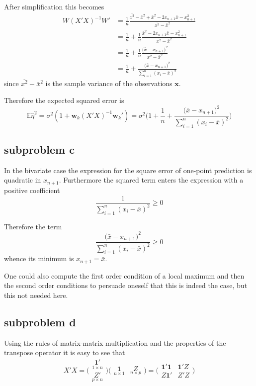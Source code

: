 \documentclass[a4paper]{article}
\newcommand{\w}{\mathbf{w}}
\newcommand{\e}{\mathbf{1}}
\newcommand{\Ex}{\mathbb{E}}
\begin{document}
After simplification this becomes
\begin{align*}
	W (X'X)^{-1} W'
	&= \frac{1}{n} \frac{ \overline{x^2} - \bar{x}^2 + \bar{x}^2 - 2 x_{n+1}\bar{x} - x_{n+1}^2 }{ \overline{x^2} - \bar{x}^2 } \\
	&= \frac{1}{n} + \frac{1}{n}\frac{ \bar{x}^2 - 2 x_{n+1}\bar{x} - x_{n+1}^2 }{ \overline{x^2} - \bar{x}^2} \\
	&= \frac{1}{n} + \frac{1}{n}\frac{ \big(\bar{x} - x_{n+1}\big)^2 }{ \overline{x^2} - \bar{x}^2 } \\
	&= \frac{1}{n} + \frac{ \big(\bar{x} - x_{n+1}\big)^2 }{ \sum_{i=1}^n (x_i - \bar{x})^2 }
\end{align*}
since $\overline{x^2} - \bar{x}^2$ is the sample variance of the observations
$\mathbf{x}$.

Therefore the expected squared error is 
\[
	\Ex \hat{\eta}^2
	= \sigma^2( 1 + \w_k (X'X)^{-1} \w_k' )
	= \sigma^2 \Big( 1 + \frac{1}{n} + \frac{ \big(\bar{x} - x_{n+1}\big)^2 }{ \sum_{i=1}^n (x_i - \bar{x})^2 } \Big)
\]


\subsection{subproblem c} %
\label{sub:subproblem_c}

In the bivariate case the expression for the square error of one-point
prediction is quadratic in $x_{n+1}$. Furthermore the squared term enters the
expression with a positive coefficient \[\frac{1}{\sum_{i=1}^n (x_i - \bar{x})^2}\geq 0\]

Therefore the term
\[\frac{ \big(\bar{x} - x_{n+1}\big)^2 }{ \sum_{i=1}^n (x_i - \bar{x})^2 } \geq 0 \]
whence its minimum is $x_{n+1} = \bar{x}$.

One could also compute the first order condition of a local maximum and then
the second order conditions to persuade oneself that this is indeed the case,
but this not needed here.


\subsection{subproblem d} %
\label{sub:subproblem_d}

Using the rules of matrix-matrix multiplication and the properties of the
transpose operator it is easy to see that
\[
X'X 
= \Bigg(\begin{matrix} \underset{1\times n}{\e'} \\ \underset{p\times n}{Z'} \end{matrix}\Bigg) \Big(\begin{matrix} \underset{n\times 1}{\e} & \underset{n\times p}{Z} \end{matrix}\Big)
= \bigg(\begin{matrix} \e'\e & \e'Z \\ Z\e' & Z'Z \end{matrix}\bigg) 
\]
\end{document}

